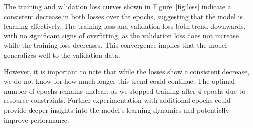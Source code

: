             The training and validation loss curves shown in Figure~\ref{fig:loss} indicate a consistent decrease in both losses over the epochs, suggesting that the model is learning effectively. The training loss and validation loss both trend downwards, with no significant signs of overfitting, as the validation loss does not increase while the training loss decreases. This convergence implies that the model generalizes well to the validation data.
            
            However, it is important to note that while the losses show a consistent decrease, we do not know for how much longer this trend could continue. The optimal number of epochs remains unclear, as we stopped training after 4 epochs due to resource constraints. Further experimentation with additional epochs could provide deeper insights into the model's learning dynamics and potentially improve performance. 
            
